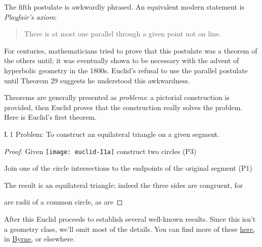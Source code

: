 The fifth postulate is awkwardly phrased. An equivalent modern statement is \emph{Playfair's axiom}:
\begin{quote}
	There is at most one parallel through a given point not on line.
\end{quote}
For centuries, mathematicians tried to prove that this postulate was a theorem of the others until; it was eventually shown to be necessary with the advent of hyperbolic geometry in the 1800s. Euclid's refusal to use the parallel postulate until Theorem 29 suggests he understood this awkwardness.\smallbreak


Theorems are generally presented as \emph{problems}: a pictorial construction is provided, then Euclid proves that the construction really solves the problem. Here is Euclid's first theorem.

\begin{thm*}{I.\,1}{}\label{pg:euclidI1}
	Problem: To construct an equilateral triangle on a given segment.
\end{thm*}

\begin{proof}
	Given \texttt{[image: euclid-I1a]} construct two circles (P3)\quad{}\par\vspace{-23pt}
	Join one of the circle intersections to the endpoints of the original segment (P1)\quad {}\par\vspace{-11pt}
	The result is an equilateral triangle; indeed the three sides are congruent, for\par {} are radii of a common circle,
	as are 
\end{proof}

\goodbreak

After this Euclid proceeds to establish several well-known results. Since this isn't a geometry class, we'll omit most of the details. You can find more of these \href{http://math.uci.edu/~ndonalds/math161/euclid.pdf}{here,} in \href{http://math.uci.edu/~ndonalds/Elements-I-VI.pdf}{Byrne,} or elsewhere.

